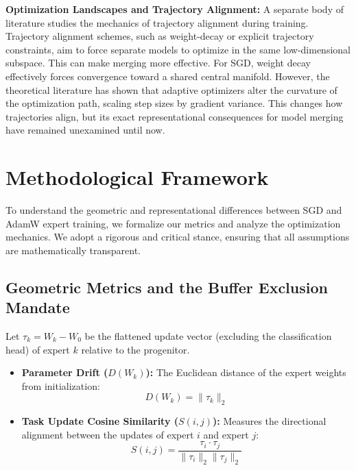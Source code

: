 \documentclass{article}
\theoremstyle{plain}
\theoremstyle{definition}
\theoremstyle{remark}
\begin{document}
\textbf{Optimization Landscapes and Trajectory Alignment:}
A separate body of literature studies the mechanics of trajectory alignment during training. Trajectory alignment schemes, such as weight-decay or explicit trajectory constraints, aim to force separate models to optimize in the same low-dimensional subspace. This can make merging more effective. For SGD, weight decay effectively forces convergence toward a shared central manifold. However, the theoretical literature has shown that adaptive optimizers alter the curvature of the optimization path, scaling step sizes by gradient variance. This changes how trajectories align, but its exact representational consequences for model merging have remained unexamined until now.

\section{Methodological Framework}
\label{sec:framework}

To understand the geometric and representational differences between SGD and AdamW expert training, we formalize our metrics and analyze the optimization mechanics. We adopt a rigorous and critical stance, ensuring that all assumptions are mathematically transparent.

\subsection{Geometric Metrics and the Buffer Exclusion Mandate}
Let $\tau_k = W_k - W_0$ be the flattened update vector (excluding the classification head) of expert $k$ relative to the progenitor.
\begin{itemize}
    \item \textbf{Parameter Drift ($D(W_k)$):} The Euclidean distance of the expert weights from initialization:
    \begin{equation}
        D(W_k) = \|\tau_k\|_2
    \end{equation}
    \item \textbf{Task Update Cosine Similarity ($S(i, j)$):} Measures the directional alignment between the updates of expert $i$ and expert $j$:
    \begin{equation}
        S(i, j) = \frac{\tau_i \cdot \tau_j}{\|\tau_i\|_2 \|\tau_j\|_2}
    \end{equation}
\end{itemize}
\end{document}

